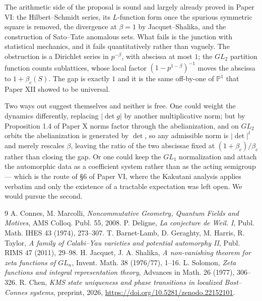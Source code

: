 \documentclass[11pt]{amsart}
\numberwithin{equation}{section}
\theoremstyle{definition}
\theoremstyle{remark}
\begin{document}
The arithmetic side of the proposal is sound and largely already proved in
Paper VI: the Hilbert--Schmidt series, its $L$-function form once the spurious
symmetric square is removed, the divergence at $\beta=1$ by Jacquet--Shalika, and the
construction of Sato--Tate anomalous sets. What fails is the junction with statistical
mechanics, and it fails quantitatively rather than vaguely. The obstruction is a Dirichlet
series in $p^{-\beta}$, with abscissa at most $1$; the $GL_2$ partition function counts
sublattices, whose local factor $(1-p^{1-\beta})^{-1}$ moves the abscissa to
$1+\beta_c(S)$. The gap is exactly $1$ and it is the same off-by-one of $\mathbb P^1$ that
Paper XII showed to be universal.

Two ways out suggest themselves and neither is free. One could weight the dynamics
differently, replacing $|\det g|$ by another multiplicative norm; but by
Proposition 1.4 of Paper X norms factor through the abelianization, and on $GL_2$ orbits the
abelianization is generated by $\det$, so any admissible norm is $|\det|^t$ and merely
rescales $\beta$, leaving the ratio of the two abscissae fixed at
$(1+\beta_c)/\beta_c$ rather than closing the gap. Or one could keep the $GL_1$
normalization and attach the automorphic data as a coefficient system rather than as the
acting semigroup --- which is the route of \S6 of Paper VI, where the Kakutani analysis
applies verbatim and only the existence of a tractable expectation was left open. We would
pursue the second.

\begin{thebibliography}{9}
 A. Connes, M. Marcolli, \emph{Noncommutative Geometry, Quantum Fields and Motives}, AMS Colloq. Publ. 55, 2008.
 P. Deligne, \emph{La conjecture de Weil. I}, Publ. Math. IHES 43 (1974), 273--307.
 T. Barnet-Lamb, D. Geraghty, M. Harris, R. Taylor, \emph{A family of Calabi--Yau varieties and potential automorphy II}, Publ. RIMS 47 (2011), 29--98.
 H. Jacquet, J. A. Shalika, \emph{A non-vanishing theorem for zeta functions of $GL_n$}, Invent. Math. 38 (1976/77), 1--16.
 L. Solomon, \emph{Zeta functions and integral representation theory}, Advances in Math. 26 (1977), 306--326.
 R. Chen, \emph{KMS state uniqueness and phase transitions in localized Bost--Connes systems}, preprint, 2026, \newline\url{https://doi.org/10.5281/zenodo.22152101}.
\end{thebibliography}
\end{document}
